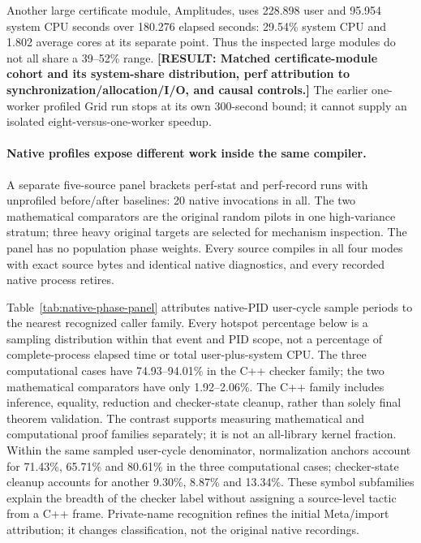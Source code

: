 \documentclass[10pt,twocolumn]{article}
\newcommand{\missing}[1]{\textbf{[RESULT: #1]}}
\begin{document}
Another large certificate module, Amplitudes, uses 228.898 user and
95.954 system CPU seconds over 180.276 elapsed seconds:
29.54\% system CPU and 1.802 average cores at its separate point.
Thus the inspected large modules do not all share a 39--52\% range.
\missing{Matched certificate-module cohort and its system-share distribution,
perf attribution to synchronization/allocation/I/O, and causal controls.}
The earlier one-worker profiled Grid run stops at its own 300-second bound;
it cannot supply an isolated eight-versus-one-worker speedup.

\paragraph{Native profiles expose different work inside the same compiler.}
A separate five-source panel brackets perf-stat and perf-record runs with
unprofiled before/after baselines: 20 native invocations in all.
The two mathematical comparators are the original random pilots in one
high-variance stratum; three heavy original targets are selected for
mechanism inspection. The panel has no population phase weights.
Every source compiles in all four modes with exact source bytes and
identical native diagnostics, and every recorded native process retires.

Table~\ref{tab:native-phase-panel} attributes native-PID user-cycle sample
periods to the nearest recognized caller family.
Every hotspot percentage below is a sampling distribution within that
event and PID scope, not a percentage of complete-process elapsed time
or total user-plus-system CPU.
The three computational cases have 74.93--94.01\% in the C++ checker family;
the two mathematical comparators have only 1.92--2.06\%.
The C++ family includes inference, equality, reduction and checker-state
cleanup, rather than solely final theorem validation.
The contrast supports measuring mathematical and computational proof
families separately; it is not an all-library kernel fraction.
Within the same sampled user-cycle denominator, normalization anchors
account for 71.43\%, 65.71\% and 80.61\% in the three computational
cases; checker-state cleanup accounts for another 9.30\%, 8.87\% and
13.34\%. These symbol subfamilies explain the breadth of the checker
label without assigning a source-level tactic from a C++ frame.
Private-name recognition refines the initial Meta/import attribution;
it changes classification, not the original native recordings.
\end{document}
